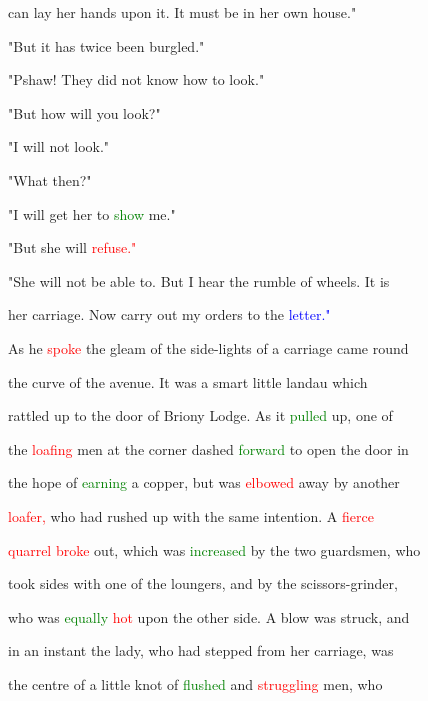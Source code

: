  can lay her hands upon it. It must be in her own house."



 "But it has twice been burgled."



 "Pshaw! They did not know how to look."



 "But how will you look?"



 "I will not look."



 "What then?"



 "I will get her to \textcolor{green}{show} me."



 "But she will \textcolor{red}{refuse."}



 "She will not be able to. But I hear the rumble of wheels. It is

 her carriage. Now carry out my orders to the \textcolor{blue}{letter."}



 As he \textcolor{red}{spoke} the gleam of the side-lights of a carriage came round

 the curve of the avenue. It was a smart little landau which

 rattled up to the door of Briony Lodge. As it \textcolor{green}{pulled} up, one of

 the \textcolor{red}{loafing} men at the corner dashed \textcolor{green}{forward} to open the door in

 the \textcolor{BurntOrange}{hope} of \textcolor{green}{earning} a copper, but was \textcolor{red}{elbowed} away by another

 \textcolor{red}{loafer,} who had rushed up with the same intention. A \textcolor{red}{fierce}

 \textcolor{red}{quarrel} \textcolor{red}{broke} out, which was \textcolor{green}{increased} by the two guardsmen, who

 took sides with one of the loungers, and by the scissors-grinder,

 who was \textcolor{green}{equally} \textcolor{red}{hot} upon the other side. A blow was struck, and

 in an instant the lady, who had stepped from her carriage, was

 the centre of a little knot of \textcolor{green}{flushed} and \textcolor{red}{struggling} men, who

